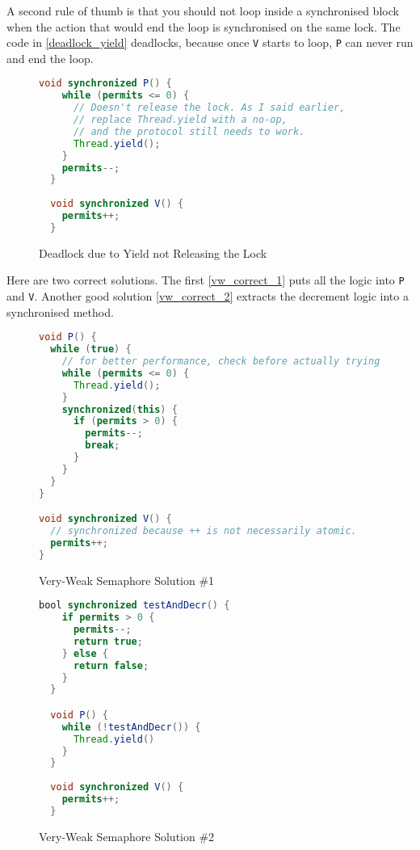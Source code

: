 \documentclass{article}
\begin{document}
A second rule of thumb is that you should not loop inside a synchronised block
when the action that would end the loop is synchronised on the same lock.
The code in \autoref{deadlock_yield} deadlocks, because once \texttt{V} starts to loop, \texttt{P}
can never run and end the loop.

\begin{figure}
\begin{lstlisting}[language=java,basicstyle=\small\ttfamily]
  void synchronized P() {
    while (permits <= 0) {
      // Doesn't release the lock. As I said earlier,
      // replace Thread.yield with a no-op,
      // and the protocol still needs to work.
      Thread.yield();
    }
    permits--;
  }
  
  void synchronized V() {
    permits++;
  }
\end{lstlisting}
\caption{Deadlock due to Yield not Releasing the Lock}
\label{deadlock_yield}
\end{figure}

Here are two correct solutions. The first \autoref{vw_correct_1} puts all
the logic into \texttt{P} and \texttt{V}.
Another good solution \autoref{vw_correct_2} extracts the decrement logic into
a synchronised method.

\begin{figure}
\begin{lstlisting}[language=java,basicstyle=\small\ttfamily]
void P() {
  while (true) {
    // for better performance, check before actually trying
    while (permits <= 0) {
      Thread.yield();
    }
    synchronized(this) {
      if (permits > 0) {
        permits--;
        break;
      }
    }
  }
}

void synchronized V() {
  // synchronized because ++ is not necessarily atomic.
  permits++;
}
\end{lstlisting}
\caption{Very-Weak Semaphore Solution \#1}
\label{vw_correct_1}
\end{figure}

\begin{figure}
\begin{lstlisting}[language=java,basicstyle=\small\ttfamily]
  bool synchronized testAndDecr() {
    if permits > 0 {
      permits--;
      return true;
    } else {
      return false;
    }
  }

  void P() {
    while (!testAndDecr()) {
      Thread.yield()
    }
  }
  
  void synchronized V() {
    permits++;
  }
\end{lstlisting}
\caption{Very-Weak Semaphore Solution \#2}
\label{vw_correct_2}
\end{figure}
\end{document}

